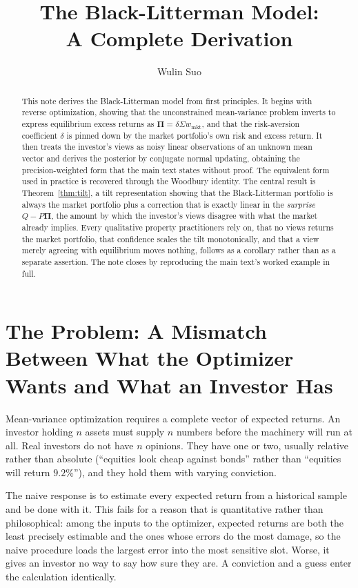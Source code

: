 \documentclass[11pt]{article}
\title{The Black-Litterman Model:\\ A Complete Derivation}
\author{Wulin Suo}
\date{}
\theoremstyle{remark}
\theoremstyle{definition}
\begin{document}
\maketitle

\begin{abstract}
\noindent This note derives the Black-Litterman model from first principles. It begins with reverse optimization, showing that the unconstrained mean-variance problem inverts to express equilibrium excess returns as $\boldsymbol\Pi = \delta\Sigma w_{\mathrm{mkt}}$, and that the risk-aversion coefficient $\delta$ is pinned down by the market portfolio's own risk and excess return. It then treats the investor's views as noisy linear observations of an unknown mean vector and derives the posterior by conjugate normal updating, obtaining the precision-weighted form that the main text states without proof. The equivalent form used in practice is recovered through the Woodbury identity. The central result is Theorem~\ref{thm:tilt}, a tilt representation showing that the Black-Litterman portfolio is always the market portfolio plus a correction that is exactly linear in the \emph{surprise} $Q - P\boldsymbol\Pi$, the amount by which the investor's views disagree with what the market already implies. Every qualitative property practitioners rely on, that no views returns the market portfolio, that confidence scales the tilt monotonically, and that a view merely agreeing with equilibrium moves nothing, follows as a corollary rather than as a separate assertion. The note closes by reproducing the main text's worked example in full.
\end{abstract}

\section{The Problem: A Mismatch Between What the Optimizer Wants and What an Investor Has}
\label{sec:problem}

Mean-variance optimization requires a complete vector of expected returns. An investor holding $n$ assets must supply $n$ numbers before the machinery will run at all. Real investors do not have $n$ opinions. They have one or two, usually relative rather than absolute (``equities look cheap against bonds'' rather than ``equities will return $9.2\%$''), and they hold them with varying conviction.

The naive response is to estimate every expected return from a historical sample and be done with it. This fails for a reason that is quantitative rather than philosophical: among the inputs to the optimizer, expected returns are both the least precisely estimable and the ones whose errors do the most damage, so the naive procedure loads the largest error into the most sensitive slot. Worse, it gives an investor no way to say how sure they are. A conviction and a guess enter the calculation identically.
\end{document}
